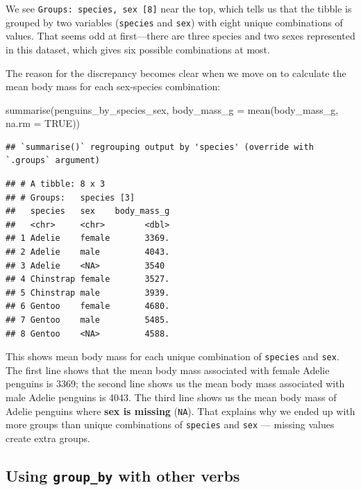 \documentclass[
]{book}
\newenvironment{Shaded}{\begin{snugshade}}{\end{snugshade}}
\newcommand{\AttributeTok}[1]{\textcolor[rgb]{0.77,0.63,0.00}{#1}}
\newcommand{\ConstantTok}[1]{\textcolor[rgb]{0.00,0.00,0.00}{#1}}
\newcommand{\FunctionTok}[1]{\textcolor[rgb]{0.00,0.00,0.00}{#1}}
\newcommand{\NormalTok}[1]{#1}
\begin{document}
We see \texttt{Groups:\ species,\ sex\ {[}8{]}} near the top, which tells us that the tibble is grouped by two variables (\texttt{species} and \texttt{sex}) with eight unique combinations of values. That seems odd at first---there are three species and two sexes represented in this dataset, which gives six possible combinations at most.

The reason for the discrepancy becomes clear when we move on to calculate the mean body mass for each sex-species combination:

\begin{Shaded}
\begin{Highlighting}[]
\FunctionTok{summarise}\NormalTok{(penguins\_by\_species\_sex, }
          \AttributeTok{body\_mass\_g =} \FunctionTok{mean}\NormalTok{(body\_mass\_g, }\AttributeTok{na.rm =} \ConstantTok{TRUE}\NormalTok{))}
\end{Highlighting}
\end{Shaded}

\begin{verbatim}
## `summarise()` regrouping output by 'species' (override with `.groups` argument)
\end{verbatim}

\begin{verbatim}
## # A tibble: 8 x 3
## # Groups:   species [3]
##   species   sex    body_mass_g
##   <chr>     <chr>        <dbl>
## 1 Adelie    female       3369.
## 2 Adelie    male         4043.
## 3 Adelie    <NA>         3540 
## 4 Chinstrap female       3527.
## 5 Chinstrap male         3939.
## 6 Gentoo    female       4680.
## 7 Gentoo    male         5485.
## 8 Gentoo    <NA>         4588.
\end{verbatim}

This shows mean body mass for each unique combination of \texttt{species} and \texttt{sex}. The first line shows that the mean body mass associated with female Adelie penguins is 3369; the second line shows us the mean body mass associated with male Adelie penguins is 4043. The third line shows us the mean body mass of Adelie penguins where \textbf{sex is missing} (\texttt{NA}). That explains why we ended up with more groups than unique combinations of \texttt{species} and \texttt{sex} --- missing values create extra groups.

\hypertarget{using-group_by-with-other-verbs}{%
\subsection{\texorpdfstring{Using \texttt{group\_by} with other verbs}{Using group\_by with other verbs}}\label{using-group_by-with-other-verbs}}
\end{document}
